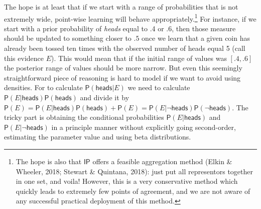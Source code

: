 \documentclass[
  10pt,
  dvipsnames,enabledeprecatedfontcommands]{scrartcl}
\newcommand{\pr}[1]{\mathsf{P}(#1)}
\newcommand{\s}[1]{\mbox{$\mathsf{#1}$}}
\begin{document}
The hope is at least that if we start with a range of probabilities that
is not extremely wide, point-wise learning will behave
appropriately.\footnote{The hope is also that \s{IP} offers a feasible
  aggregation method (Elkin \& Wheeler, 2018; Stewart \& Quintana,
  2018): just put all representors together in one set, and
  voil\textquotesingle a! However, this is a very conservative method
  which quickly leads to extremely few points of agreement, and we are
  not aware of any successful practical deployment of this method.} For
instance, if we start with a prior probability of \emph{heads} equal to
.4 or .6, then those measure should be updated to something closer to
\(.5\) once we learn that a given coin has already been tossed ten times
with the observed number of heads equal 5 (call this evidence \(E\)).
This would mean that if the initial range of values was \([.4,.6]\) the
posterior range of values should be more narrow. But even this seemingly
straightforward piece of reasoning is hard to model if we want to avoid
using densities. For to calculate \(\pr{\s{heads}\vert E}\) we need to
calculate \(\pr{E \vert \s{heads}}\pr{\s{heads}}\) and divide it by
\(\pr{E} = \pr{E \vert \s{heads}}\pr{\s{heads}} + \pr{E} = \pr{E \vert \neg \s{heads}}\pr{\neg \s{heads}}\).
The tricky part is obtaining the conditional probabilities
\(\pr{E \vert \s{heads}}\) and \(\pr{E \vert \neg \s{heads}}\) in a
principle manner without explicitly going second-order, estimating the
parameter value and using beta distributions.
\end{document}
